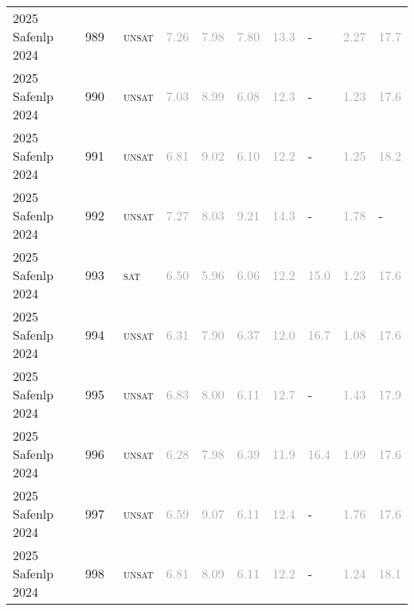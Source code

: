 \begin{center}
{\begin{longtable}{@{}llllllllll@{}}
2025 Safenlp 2024 & 989 & ~\textsc{unsat} & \textcolor{darkgray}{7.26} & \textcolor{darkgray}{7.98} & \textcolor{darkgray}{7.80} & \textcolor{darkgray}{13.3} & - & \textcolor{darkgray}{2.27} & \textcolor{darkgray}{17.7} \\
2025 Safenlp 2024 & 990 & ~\textsc{unsat} & \textcolor{darkgray}{7.03} & \textcolor{darkgray}{8.99} & \textcolor{darkgray}{6.08} & \textcolor{darkgray}{12.3} & - & \textcolor{darkgray}{1.23} & \textcolor{darkgray}{17.6} \\
2025 Safenlp 2024 & 991 & ~\textsc{unsat} & \textcolor{darkgray}{6.81} & \textcolor{darkgray}{9.02} & \textcolor{darkgray}{6.10} & \textcolor{darkgray}{12.2} & - & \textcolor{darkgray}{1.25} & \textcolor{darkgray}{18.2} \\
2025 Safenlp 2024 & 992 & ~\textsc{unsat} & \textcolor{darkgray}{7.27} & \textcolor{darkgray}{8.03} & \textcolor{darkgray}{9.21} & \textcolor{darkgray}{14.3} & - & \textcolor{darkgray}{1.78} & - \\
2025 Safenlp 2024 & 993 & ~\textsc{sat} & \textcolor{darkgray}{6.50} & \textcolor{darkgray}{5.96} & \textcolor{darkgray}{6.06} & \textcolor{darkgray}{12.2} & \textcolor{darkgray}{15.0} & \textcolor{darkgray}{1.23} & \textcolor{darkgray}{17.6} \\
2025 Safenlp 2024 & 994 & ~\textsc{unsat} & \textcolor{darkgray}{6.31} & \textcolor{darkgray}{7.90} & \textcolor{darkgray}{6.37} & \textcolor{darkgray}{12.0} & \textcolor{darkgray}{16.7} & \textcolor{darkgray}{1.08} & \textcolor{darkgray}{17.6} \\
2025 Safenlp 2024 & 995 & ~\textsc{unsat} & \textcolor{darkgray}{6.83} & \textcolor{darkgray}{8.00} & \textcolor{darkgray}{6.11} & \textcolor{darkgray}{12.7} & - & \textcolor{darkgray}{1.43} & \textcolor{darkgray}{17.9} \\
2025 Safenlp 2024 & 996 & ~\textsc{unsat} & \textcolor{darkgray}{6.28} & \textcolor{darkgray}{7.98} & \textcolor{darkgray}{6.39} & \textcolor{darkgray}{11.9} & \textcolor{darkgray}{16.4} & \textcolor{darkgray}{1.09} & \textcolor{darkgray}{17.6} \\
2025 Safenlp 2024 & 997 & ~\textsc{unsat} & \textcolor{darkgray}{6.59} & \textcolor{darkgray}{9.07} & \textcolor{darkgray}{6.11} & \textcolor{darkgray}{12.4} & - & \textcolor{darkgray}{1.76} & \textcolor{darkgray}{17.6} \\
2025 Safenlp 2024 & 998 & ~\textsc{unsat} & \textcolor{darkgray}{6.81} & \textcolor{darkgray}{8.09} & \textcolor{darkgray}{6.11} & \textcolor{darkgray}{12.2} & - & \textcolor{darkgray}{1.24} & \textcolor{darkgray}{18.1} \\

\end{longtable}}
\end{center}
